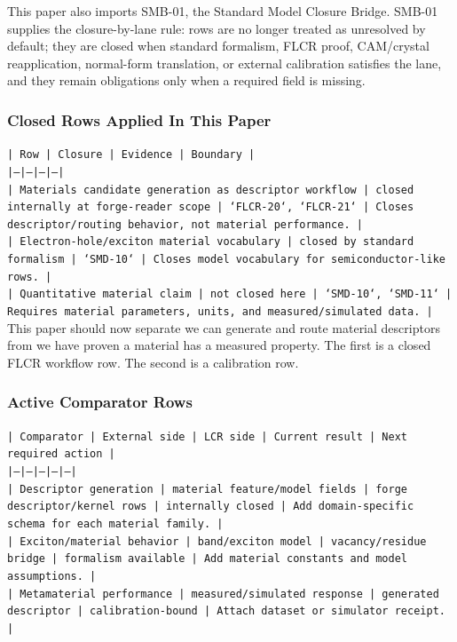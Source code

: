 \documentclass[11pt]{article}
\begin{document}
This paper also imports SMB-01, the Standard Model Closure Bridge. SMB-01 supplies the closure-by-lane rule: rows are no longer treated as unresolved by default; they are closed when standard formalism, FLCR proof, CAM/crystal reapplication, normal-form translation, or external calibration satisfies the lane, and they remain obligations only when a required field is missing.

\subsubsection*{Closed Rows Applied In This Paper}

\noindent\texttt{| Row | Closure | Evidence | Boundary |}\\
\noindent\texttt{|---|---|---|---|}\\
\noindent\texttt{| Materials candidate generation as descriptor workflow | closed internally at forge-reader scope | `FLCR-20`, `FLCR-21` | Closes descriptor/routing behavior, not material performance. |}\\
\noindent\texttt{| Electron-hole/exciton material vocabulary | closed by standard formalism | `SMD-10` | Closes model vocabulary for semiconductor-like rows. |}\\
\noindent\texttt{| Quantitative material claim | not closed here | `SMD-10`, `SMD-11` | Requires material parameters, units, and measured/simulated data. |}\\

This paper should now separate we can generate and route material descriptors from we have proven a material has a measured property. The first is a closed FLCR workflow row. The second is a calibration row.

\subsubsection*{Active Comparator Rows}

\noindent\texttt{| Comparator | External side | LCR side | Current result | Next required action |}\\
\noindent\texttt{|---|---|---|---|---|}\\
\noindent\texttt{| Descriptor generation | material feature/model fields | forge descriptor/kernel rows | internally closed | Add domain-specific schema for each material family. |}\\
\noindent\texttt{| Exciton/material behavior | band/exciton model | vacancy/residue bridge | formalism available | Add material constants and model assumptions. |}\\
\noindent\texttt{| Metamaterial performance | measured/simulated response | generated descriptor | calibration-bound | Attach dataset or simulator receipt. |}\\
\end{document}

